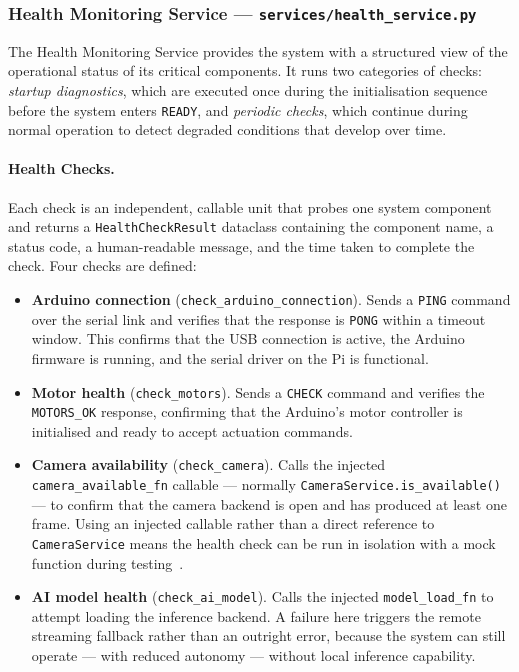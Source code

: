 \subsubsection{Health Monitoring Service —
	\texttt{services/health\_service.py}}
\label{sec:health_service}

The Health Monitoring Service provides the system with a structured
view of the operational status of its critical components. It runs
two categories of checks: \emph{startup diagnostics}, which are
executed once during the initialisation sequence before the system
enters \texttt{READY}, and \emph{periodic checks}, which continue
during normal operation to detect degraded conditions that develop
over time.

\paragraph{Health Checks.}

Each check is an independent, callable unit that probes one system
component and returns a \texttt{HealthCheckResult} dataclass
containing the component name, a status code, a human-readable
message, and the time taken to complete the check. Four checks are
defined:

\begin{itemize}
	\item \textbf{Arduino connection} (\texttt{check\_arduino\_connection}).
	Sends a \texttt{PING} command over the serial link and
	verifies that the response is \texttt{PONG} within a
	timeout window. This confirms that the USB connection is
	active, the Arduino firmware is running, and the serial
	driver on the Pi is functional.
	
	\item \textbf{Motor health} (\texttt{check\_motors}).
	Sends a \texttt{CHECK} command and verifies the
	\texttt{MOTORS\_OK} response, confirming that the Arduino's
	motor controller is initialised and ready to accept
	actuation commands.
	
	\item \textbf{Camera availability} (\texttt{check\_camera}).
	Calls the injected \texttt{camera\_available\_fn} callable
	— normally \texttt{CameraService.is\_available()} — to
	confirm that the camera backend is open and has produced
	at least one frame. Using an injected callable rather than
	a direct reference to \texttt{CameraService} means the
	health check can be run in isolation with a mock function
	during testing~\cite{gamma1994design}.
	
	\item \textbf{AI model health} (\texttt{check\_ai\_model}).
	Calls the injected \texttt{model\_load\_fn} to attempt
	loading the inference backend. A failure here triggers the
	remote streaming fallback rather than an outright error,
	because the system can still operate — with reduced
	autonomy — without local inference capability.
\end{itemize}

